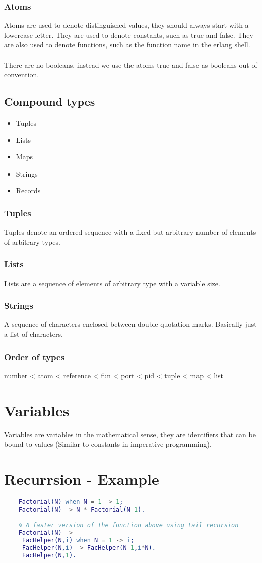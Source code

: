 \subsubsection{Atoms}
Atoms are used to denote distinguished values, they should always start with a lowercase letter. They are used to denote constants, such as true and false. They are also used to denote functions, such as the function name in the erlang shell.\\
\\
There are no booleans, instead we use the atoms true and false as booleans out of convention.
\subsection{Compound types}
\begin{itemize}
	\item Tuples
	\item Lists
	\item Maps
	\item Strings
	\item Records
\end{itemize}
\subsubsection{Tuples}
Tuples denote  an ordered sequence with a fixed but arbitrary number of elements of arbitrary types.
\subsubsection{Lists}
Lists are a sequence of elements of arbitrary type with a variable size.
\subsubsection{Strings}
A sequence of characters enclosed between double quotation marks. Basically just a list of characters.
\subsubsection{Order of types}
number < atom < reference < fun < port < pid < tuple < map < list

\section{Variables}
Variables are variables in the mathematical sense, they are identifiers that can be bound to values (Similar to constants in imperative programming).\\

\section{Recurrsion - Example}
\begin{lstlisting}[language=erlang]
	% A slow version of the factorial function using recursion
	Factorial(N) when N = 1 -> 1;
	Factorial(N) -> N * Factorial(N-1).

	% A faster version of the function above using tail recursion
	Factorial(N) ->
	 FacHelper(N,i) when N = 1 -> i;
	 FacHelper(N,i) -> FacHelper(N-1,i*N).
	 FacHelper(N,1).
\end{lstlisting}